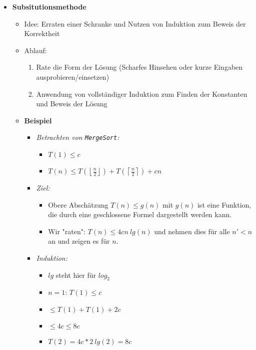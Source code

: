 \begin{itemize}
        \item \textbf{Subsitutionsmethode}
            \begin{itemize}
                \item Idee: Erraten einer Schranke und Nutzen von Induktion zum Beweis der Korrektheit
                \item Ablauf:
                    \begin{enumerate}
                        \item Rate die Form der Lösung (Scharfes Hinsehen oder kurze Eingaben ausprobieren/einsetzen)
                        \item Anwendung von vollständiger Induktion zum Finden der Konstanten und Beweis der Lösung
                    \end{enumerate}
                \item \textbf{Beispiel}
                    \begin{itemize}
                        \item \textit{Betrachten von \texttt{MergeSort}:}
                            \begin{itemize}
                                \item $T(1) \leq c$
                                \item $T(n) \leq T(\left \lfloor \frac{n}{2} \right \rfloor) + T(\left \lceil \frac{n}{2} \right \rceil) + cn$
                            \end{itemize}

                        \item \textit{Ziel:}
                            \begin{itemize}
                                \item[]
                                    Obere Abschätzung $T(n) \leq g(n)$ mit $g(n)$ ist eine Funktion, die durch eine 
                                    geschlossene Formel dargestellt werden kann.
                                \item[] 
                                    Wir \string"raten\string": $T(n) \leq 4cn~lg(n)$ und nehmen dies für alle $n' < n$ an und 
                                    zeigen es für $n$. 
                            \end{itemize}

                        \item \textit{Induktion:}
                            \begin{itemize}
                                \item $lg$ steht hier für $log_2$
                                \item $n = 1$: $T(1) \leq c$
                                \item {}  $\leq T(1) + T(1) +2c$
                                \item[] {\makebox[2cm][l]{}} $\leq 4c \leq 8c$
                                \item[] {\makebox[1cm][l]{}} $T(2) = 4c * 2~lg(2) = 8c$
                            \end{itemize}


\end{itemize}
\end{itemize}
\end{itemize}
